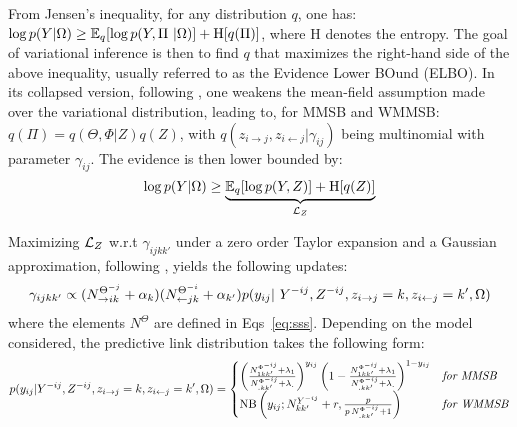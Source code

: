 From Jensen's inequality, for any distribution $q$, one has: $\log p(Y | \Omega) \ge \mathbb{E}_{q}[\log p(Y, \Pi\ | \Omega)] + \textrm{H}[q(\Pi)]$, 
where $\textrm{H}$ denotes the entropy. The goal of variational inference is then to find $q$ that maximizes the right-hand side of the above inequality, usually referred to as the Evidence Lower BOund (ELBO). In its collapsed version, following \cite{teh2006collapsed}, one weakens the mean-field assumption made over the variational distribution, leading to, for MMSB and WMMSB: $q(\Pi) = q(\Theta, \Phi | Z) q(Z)$,
with $q(z_{i \rightarrow j}, z_{i \leftarrow j}|\gamma_{ij})$ being multinomial with parameter $\gamma_{ij}$. The evidence is then lower bounded by:
%
\begin{equation*}
\log p(Y|\Omega) \geq \underbrace{\mathbb{E}_{q}[\log p(Y, Z)] + \textrm{H}[q(Z)]}_{\mathcal{L}_Z}
\end{equation*}

Maximizing $\mathcal{L}_Z$ w.r.t $\gamma_{ijkk'}$ under a zero order Taylor expansion and a Gaussian approximation, following \cite{teh2006collapsed,asuncion2009smoothing}, yields the following updates:
%
\begin{equation} \label{eq:maximization}
\gamma_{ijkk'} \propto (N_{\rightarrow ik}^{\Theta^{-j}} + \alpha_k) (N_{\leftarrow jk}^{\Theta^{-i}} + \alpha_{k'}) p(y_{ij} | Y^{-ij}, Z^{- ij}, \zij=k, \zji=k',\Omega)
\end{equation}
%
where the elements $N^{\Theta}$ are defined in Eqs~\eqref{eq:sss}. Depending on the model considered, the predictive link distribution 
takes the following form:
%
\begin{align*}
p(y_{ij} | Y^{-ij}, Z^{- ij}, \zij=k, \zji=k',\Omega) = \begin{cases}
    \left( \frac{ N^{\Phi^{-ij}}_{1 kk'} + \lambda_1}{N^{\Phi^{-ij}}_{\bm{.}kk'} + \lambda_{\bm{.}}}\right)^{y_{ij}} \left( 1- \frac{ N^{\Phi^{-ij}}_{1 kk'} + \lambda_1}{N^{\Phi^{-ij}}_{\bm{.}kk'} + \lambda_{\bm{.}}}\right)^{1-y_{ij}}  & \textrm{\textit{for MMSB}} \\
    \mathrm{NB}\left(y_{ij}; N^{Y^{-ij}}_{kk'} + r, \frac{p}{p\,N^{\Phi^{-ij}}_{\bm{.}kk'} + 1} \right) & \textrm{\textit{for WMMSB}} %
\end{cases}
\end{align*}

